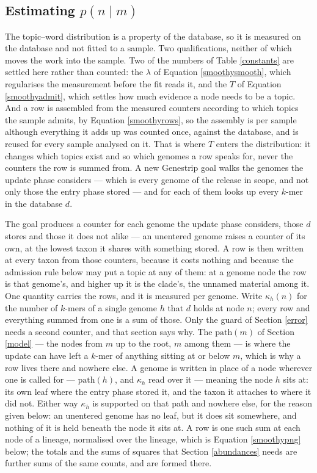 \documentclass[pdflatex,sn-vancouver-num]{sn-jnl}
\begin{document}
    \subsection{Estimating \texorpdfstring{$p(n \mid m)$}{p(n|m)}}\label{pgn}
    The topic--word distribution is a property of the database, so it is measured on the database and
    not fitted to a sample. Two qualifications, neither of which moves the work into the sample. Two
    of the numbers of Table \ref{constants} are settled here rather than counted: the $\lambda$ of
    Equation \eqref{smoothysmooth}, which regularises the measurement before the fit reads it, and
    the $T$ of Equation \eqref{smoothyadmit}, which settles how much evidence a node needs to be a
    topic. And a row is assembled from the measured
    counters according to which topics the sample admits, by Equation \eqref{smoothyrows}, so the
    assembly is per sample although everything it adds up was counted once, against the database, and
    is reused for every sample analysed on it. That is where $T$ enters the distribution: it changes
    which topics exist and so which genomes a row speaks for, never the counters the row is summed
    from. A new Genestrip goal walks the genomes the update phase
    considers ---
    which is every genome of the release in scope, and not only those the entry phase stored --- and
    for each of them looks up every $k$-mer in the database $d$.

    The goal produces a counter for each genome the update phase considers, those $d$ stores and
    those it does not alike --- an unentered genome raises a counter of its own, at the lowest taxon
    it shares with something stored. A row is then written at every taxon from those counters, because
    it costs nothing and because the admission rule below may put a topic at any of them: at a genome
    node the row is that genome's, and higher up it is the clade's, the unnamed material among it.
    One quantity carries the rows, and it is measured per genome. Write $\kappa_h(n)$ for the number
    of $k$-mers of a single genome $h$ that $d$ holds at node $n$; every row and everything summed
    from one is a sum of those. Only the guard of Section \ref{error} needs a second counter, and
    that section says why.
    The $\mathrm{path}(m)$ of Section \ref{model} --- the nodes from $m$ up to the root, $m$ among
    them --- is where the update can have left a $k$-mer of anything sitting at or below $m$, which
    is why a row lives there and nowhere else.
    A genome is written in place of a node wherever one is called for --- $\mathrm{path}(h)$, and
    $\kappa_h$ read over it --- meaning the node $h$ sits at: its own leaf where the entry phase
    stored it, and the taxon it attaches to where it did not. Either way $\kappa_h$ is supported on
    that path and nowhere else, for the reason given below: an unentered genome has no leaf, but it
    does sit somewhere, and nothing of it is held beneath the node it sits at.
    A row is one such sum at each node of a lineage, normalised over the lineage, which is
    Equation \eqref{smoothypng} below; the totals and the sums of squares that
    Section \ref{abundances} needs are further sums of the same counts, and are formed there.
\end{document}
